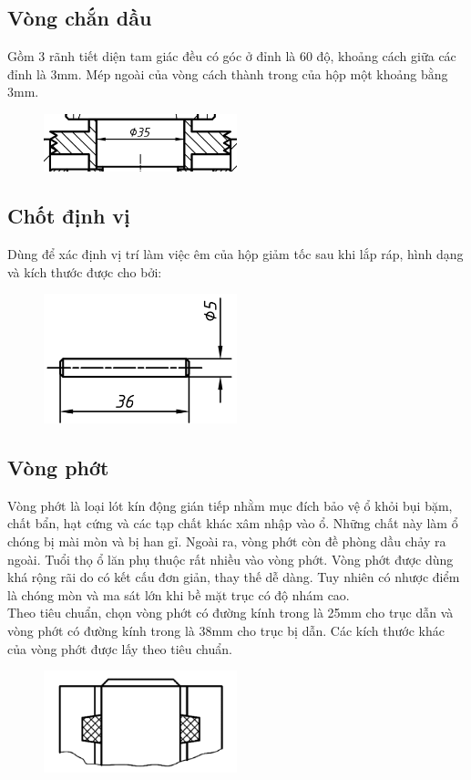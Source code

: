 \subsection{Vòng chắn dầu}
Gồm 3 rãnh tiết diện tam giác đều có góc ở đỉnh là 60 độ, khoảng cách giữa các đỉnh là 3mm. Mép ngoài của vòng cách thành trong của hộp một khoảng bằng 3mm. 
\begin{figure}[H]
    \centering
    \includegraphics[width=0.5\textwidth]{pictures/vongchandau.png}
\end{figure}
\subsection{Chốt định vị}
Dùng để xác định vị trí làm việc êm của hộp giảm tốc sau khi lắp ráp, hình dạng và kích thước được cho bởi:
\begin{figure}[H]
    \centering
    \includegraphics[width=0.5\textwidth]{pictures/chotdinhvi.png}
\end{figure}
\subsection{Vòng phớt}
Vòng phớt là loại lót kín động gián tiếp nhằm mục đích bảo vệ ổ khỏi bụi bặm, chất bẩn, hạt cứng và các tạp chất khác xâm nhập vào ổ. Những chất này làm ổ chóng bị mài mòn và bị han gỉ. Ngoài ra, vòng phớt còn đề phòng dầu chảy ra ngoài. Tuổi thọ ổ lăn phụ thuộc rất nhiều vào vòng phớt. Vòng phớt được dùng khá rộng rãi do có kết cấu đơn giản, thay thế dễ dàng. Tuy nhiên có nhược điểm là chóng mòn và ma sát lớn khi bề mặt trục có độ nhám cao.\\
Theo tiêu chuẩn, chọn vòng phớt có đường kính trong là 25mm cho trục dẫn và vòng phớt có đường kính trong là 38mm cho trục bị dẫn. Các kích thước khác của vòng phớt được lấy theo tiêu chuẩn.
\begin{figure}[H]
    \centering
    \includegraphics[width=0.5\textwidth]{pictures/vongphot.png}
\end{figure}
\cleardoublepage
